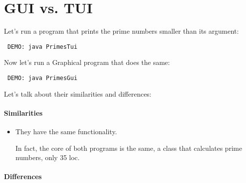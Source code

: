 \documentclass[a4paper, 9pt]{extarticle}
\begin{document}
\section{GUI vs. TUI}

Let's run a program that prints the prime numbers smaller than its argument:

\verb+ DEMO: java PrimesTui+

Now let's run a Graphical program that does the same:

\verb+ DEMO: java PrimesGui+

Let's talk about their similarities and differences:

\paragraph{Similarities}

\begin{itemize}

  \item They have the same functionality.

    In fact, the core of both programs is the same, a class that calculates
    prime numbers, only 35 loc.

\end{itemize}

\paragraph{Differences}
\end{document}
